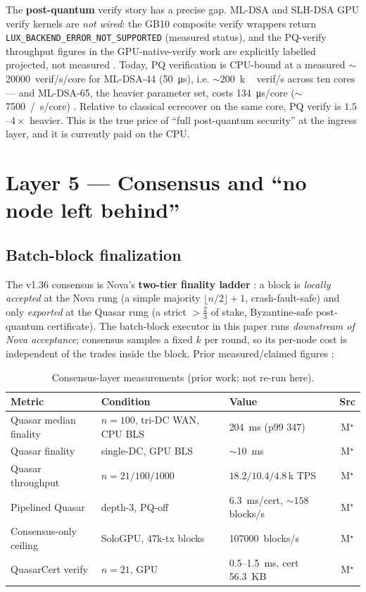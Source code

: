\documentclass[11pt,a4paper]{article}
\newcommand{\Mprior}{M$^\star$}                          %
\begin{document}
The \textbf{post-quantum} verify story has a precise gap. ML-DSA and
SLH-DSA GPU verify kernels are \emph{not wired}: the GB10 composite
verify wrappers return \texttt{LUX\_BACKEND\_ERROR\_NOT\_SUPPORTED}
(measured status), and the PQ-verify throughput figures in the
GPU-native-verify work are explicitly labelled projected, not measured
\cite{lp203,lp137}. Today, PQ verification is CPU-bound at a measured
${\sim}$\SI{20000}{verif/s/core} for ML-DSA-44 (\SI{50}{\micro s}),
i.e. ${\sim}$\SI{200}{k\,verif/s} across ten cores --- and ML-DSA-65,
the heavier parameter set, costs \SI{134}{\micro s}/core
(${\sim}$\SI{7500}{/s/core}) \cite{evmgpubench}. Relative to classical
ecrecover on the same core, PQ verify is $1.5$--$4\times$ heavier. This
is the true price of ``full post-quantum security'' at the ingress
layer, and it is currently paid on the CPU.

\section{Layer 5 --- Consensus and ``no node left behind''}\label{sec:l5}

\subsection{Batch-block finalization}

The v1.36 consensus is Nova's \textbf{two-tier finality ladder}
\cite{lp305nova}: a block is \emph{locally accepted} at the Nova rung (a simple
majority $\lfloor n/2\rfloor+1$, crash-fault-safe) and only \emph{exported} at the
Quasar rung (a strict $>\tfrac{2}{3}$ of stake, Byzantine-safe post-quantum
certificate). The batch-block executor in this paper runs \emph{downstream of Nova
acceptance}; consensus samples a fixed $k$ per round, so its per-node cost is
independent of the trades inside the block. Prior measured/claimed figures
\cite{quasarbench,lp020,lp305nova,evmgpubench}:

\begin{table}[h]\centering\small
\begin{tabular}{@{}lll c@{}}
\toprule
Metric & Condition & Value & Src \\
\midrule
Quasar median finality & $n{=}100$, tri-DC WAN, CPU BLS & \SI{204}{ms} (p99 347) & \Mprior \\
Quasar finality        & single-DC, GPU BLS            & ${\sim}$\SI{10}{ms} & \Mprior \\
Quasar throughput      & $n{=}21/100/1000$            & $18.2/10.4/4.8$\,k TPS & \Mprior \\
Pipelined Quasar       & depth-3, PQ-off              & \SI{6.3}{ms}/cert, ${\sim}158$ blocks/s & \Mprior \\
Consensus-only ceiling & SoloGPU, 47k-tx blocks      & \SI{107000}{blocks/s} & \Mprior \\
QuasarCert verify      & $n{=}21$, GPU               & \SI{0.5}{}--\SI{1.5}{ms}, cert \SI{56.3}{KB} & \Mprior \\
\bottomrule
\end{tabular}
\caption{Consensus-layer measurements (prior work; not re-run here).}
\label{tab:l5}
\end{table}
\end{document}
